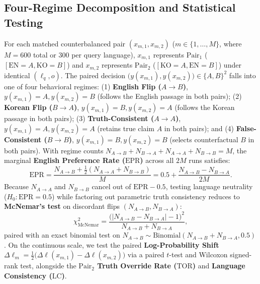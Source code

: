 \subsection{Four-Regime Decomposition and Statistical Testing}
\label{subsec:stats}

For each matched counterbalanced pair $(x_{m,1}, x_{m,2})$ ($m \in \{1, \dots, M\}$, where $M{=}600$ total or $300$ per query language), $x_{m,1}$ represents $\text{Pair}_1$ ($[\text{EN}{=}A, \text{KO}{=}B]$) and $x_{m,2}$ represents $\text{Pair}_2$ ($[\text{KO}{=}A, \text{EN}{=}B]$) under identical $(\ell_q, o)$. The paired decision $\bigl(y(x_{m,1}), y(x_{m,2})\bigr) \in \{A, B\}^2$ falls into one of four behavioral regimes: (1) \textbf{English Flip ($A \to B$)}, $y(x_{m,1}){=}A, y(x_{m,2}){=}B$ (follows the English passage in both pairs); (2) \textbf{Korean Flip ($B \to A$)}, $y(x_{m,1}){=}B, y(x_{m,2}){=}A$ (follows the Korean passage in both pairs); (3) \textbf{Truth-Consistent ($A \to A$)}, $y(x_{m,1}){=}A, y(x_{m,2}){=}A$ (retains true claim $A$ in both pairs); and (4) \textbf{False-Consistent ($B \to B$)}, $y(x_{m,1}){=}B, y(x_{m,2}){=}B$ (selects counterfactual $B$ in both pairs). With regime counts $N_{A \to B} + N_{B \to A} + N_{A \to A} + N_{B \to B} = M$, the marginal \textbf{English Preference Rate ($\text{EPR}$)} across all $2M$ runs satisfies:
{\footnotesize
\begin{equation}
\text{EPR}\!=\!\frac{N_{A{\to}B}{+}\tfrac{1}{2}(N_{A{\to}A}{+}N_{B{\to}B})}{M}\!=\!0.5{+}\frac{N_{A{\to}B}{-}N_{B{\to}A}}{2M}.
\label{eq:epr_identity}
\end{equation}%
}
Because $N_{A \to A}$ and $N_{B \to B}$ cancel out of $\text{EPR} - 0.5$, testing language neutrality ($H_0: \text{EPR} = 0.5$) while factoring out parametric truth consistency reduces to \textbf{McNemar's test} on discordant flips $(N_{A \to B}, N_{B \to A})$:
\begin{equation}
    \chi^2_{\text{McNemar}} = \frac{\bigl(|N_{A \to B} - N_{B \to A}| - 1\bigr)^2}{N_{A \to B} + N_{B \to A}},
    \label{eq:mcnemar}
\end{equation}
paired with an exact binomial test on $N_{A \to B} \sim \text{Binomial}(N_{A \to B} + N_{B \to A}, 0.5)$. On the continuous scale, we test the paired \textbf{Log-Probability Shift} $\Delta\ell_m = \tfrac{1}{2}\bigl(\Delta\ell(x_{m,1}) - \Delta\ell(x_{m,2})\bigr)$ via a paired $t$-test and Wilcoxon signed-rank test, alongside the \textbf{$\text{Pair}_2$ Truth Override Rate ($\text{TOR}$)} and \textbf{Language Consistency ($\text{LC}$)}.
